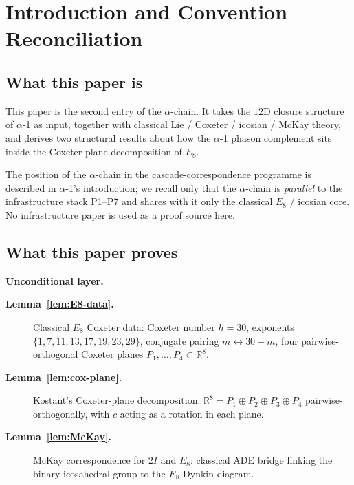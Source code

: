 \documentclass[11pt, a4paper]{amsart}
\theoremstyle{definition}
\newcommand{\R}{\mathbb{R}}
\begin{document}
\tableofcontents

\section{Introduction and Convention Reconciliation}
\label{sec:intro}

\subsection{What this paper is}

This paper is the second entry of the $\alpha$-chain. It
takes the $12$D closure structure of $\alpha$-1
\cite{Cascade12D} as input, together with classical Lie /
Coxeter / icosian / McKay theory, and derives two
structural results about how the $\alpha$-1 phason complement
sits inside the Coxeter-plane decomposition of $E_8$.

The position of the $\alpha$-chain in the cascade-correspondence
programme is described in $\alpha$-1's introduction; we recall
only that the $\alpha$-chain is \emph{parallel} to the
infrastructure stack P1--P7 and shares with it only the
classical $E_8$ / icosian core. No infrastructure paper is
used as a proof source here.

\subsection{What this paper proves}

\textbf{Unconditional layer.}
\begin{description}
\item[\textbf{Lemma~\ref{lem:E8-data}.}] Classical $E_8$
  Coxeter data: Coxeter number $h = 30$, exponents
  $\{1, 7, 11, 13, 17, 19, 23, 29\}$, conjugate pairing
  $m \leftrightarrow 30 - m$, four pairwise-orthogonal
  Coxeter planes $P_1, \ldots, P_4 \subset \R^8$.
\item[\textbf{Lemma~\ref{lem:cox-plane}.}] Kostant's Coxeter-plane
  decomposition: $\R^8 = P_1 \oplus P_2 \oplus P_3 \oplus P_4$
  pairwise-orthogonally, with $c$ acting as a rotation in each
  plane.
\item[\textbf{Lemma~\ref{lem:McKay}.}] McKay correspondence
  for $2I$ and $E_8$: classical ADE bridge linking the binary
  icosahedral group to the $E_8$ Dynkin diagram.
\end{description}
\end{document}
